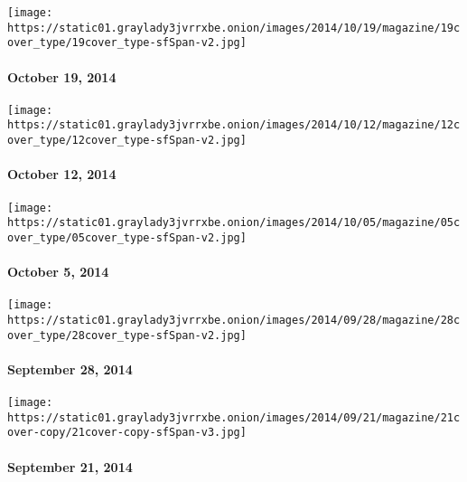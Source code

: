 \href{http://www.nytimes3xbfgragh.onion/indexes/2014/10/19/magazine/index.html}{}

\texttt{[image: https://static01.graylady3jvrrxbe.onion/images/2014/10/19/magazine/19cover\_type/19cover\_type-sfSpan-v2.jpg]}

\hypertarget{october-19-2014}{%
\paragraph{October 19, 2014}\label{october-19-2014}}

\href{http://www.nytimes3xbfgragh.onion/indexes/2014/10/12/magazine/index.html}{}

\texttt{[image: https://static01.graylady3jvrrxbe.onion/images/2014/10/12/magazine/12cover\_type/12cover\_type-sfSpan-v2.jpg]}

\hypertarget{october-12-2014}{%
\paragraph{October 12, 2014}\label{october-12-2014}}

\href{http://www.nytimes3xbfgragh.onion/indexes/2014/10/05/magazine/index.html}{}

\texttt{[image: https://static01.graylady3jvrrxbe.onion/images/2014/10/05/magazine/05cover\_type/05cover\_type-sfSpan-v2.jpg]}

\hypertarget{october-5-2014}{%
\paragraph{October 5, 2014}\label{october-5-2014}}

\href{http://www.nytimes3xbfgragh.onion/indexes/2014/09/28/magazine/index.html}{}

\texttt{[image: https://static01.graylady3jvrrxbe.onion/images/2014/09/28/magazine/28cover\_type/28cover\_type-sfSpan-v2.jpg]}

\hypertarget{september-28-2014}{%
\paragraph{September 28, 2014}\label{september-28-2014}}

\href{http://www.nytimes3xbfgragh.onion/indexes/2014/09/21/magazine/index.html}{}

\texttt{[image: https://static01.graylady3jvrrxbe.onion/images/2014/09/21/magazine/21cover-copy/21cover-copy-sfSpan-v3.jpg]}

\hypertarget{september-21-2014}{%
\paragraph{September 21, 2014}\label{september-21-2014}}

